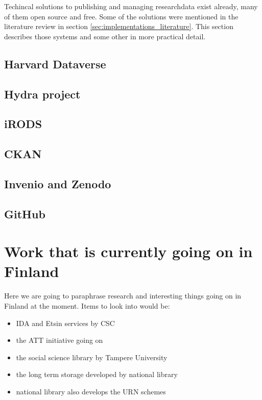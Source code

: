 Techincal solutions to publishing and managing researchdata exist already, many
of them open source and free. Some of the solutions were mentioned in the
literature review in section \ref{sec:implementations_literature}. This section describes
those systems and some other in more practical detail.

\subsection{Harvard Dataverse}

\subsection{Hydra project}

\subsection{iRODS}

\subsection{CKAN}

\subsection{Invenio and Zenodo}

\subsection{GitHub}

\section{Work that is currently going on in Finland}
\label{sec:finland_current}

Here we are going to paraphrase research and interesting things going on in
Finland at the moment. Items to look into would be:

\begin{itemize}
    \item IDA and Etsin services by CSC
    \item the ATT initiative going on
    \item the social science library by Tampere University
    \item the long term storage developed by national library
    \item national library also develops the URN schemes
\end{itemize}

